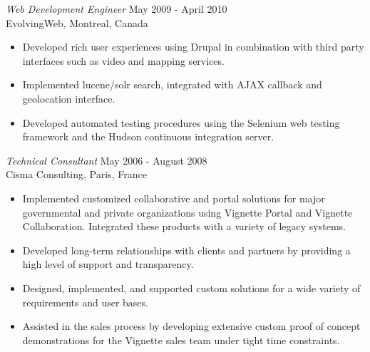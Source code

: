 \documentclass[line,margin]{res}
\begin{document}
\begin{resume}
{\sl Web Development Engineer} \hfill May 2009 - April 2010\\
                EvolvingWeb, 
                Montreal, Canada
                 \vspace{-5mm}
                 \begin{itemize}  \itemsep -2pt %
                 \item Developed rich user experiences using Drupal in
                 combination with third party interfaces such as video and
                 mapping services.
                 \item Implemented lucene/solr search, integrated with AJAX
                 callback and geolocation interface.
                 \item Developed automated testing procedures using the
                 Selenium web testing framework and the Hudson continuous
                 integration server.
                 \end{itemize}
                
{\sl Technical Consultant} \hfill May 2006 - August 2008\\
                Cisma Consulting, 
                Paris, France
                 \vspace{-5mm}
                 \begin{itemize}  \itemsep -2pt %
                 \item Implemented customized collaborative and portal solutions for major governmental and private organizations using Vignette Portal and Vignette Collaboration. Integrated these products with a variety of legacy systems. 
                \item Developed long-term relationships with clients and partners by providing a high level of support and transparency.
                \item Designed, implemented, and supported custom solutions for
                a wide variety of requirements and user bases. 
				\item Assisted in the sales process by developing extensive custom proof of concept demonstrations for the Vignette sales team under tight time constraints.
                \end{itemize}
                                    

\end{resume}
\end{document}
